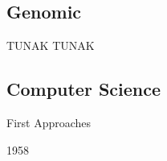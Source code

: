 \subsection{Genomic}

\begin{frame}[plain]{TUNAK TUNAK}
\end{frame}

\subsection{Computer Science}

\begin{frame}{First Approaches}
  \begin{block}{1958}
    \cite{fraser1958monte}
  \end{block}
\end{frame}

